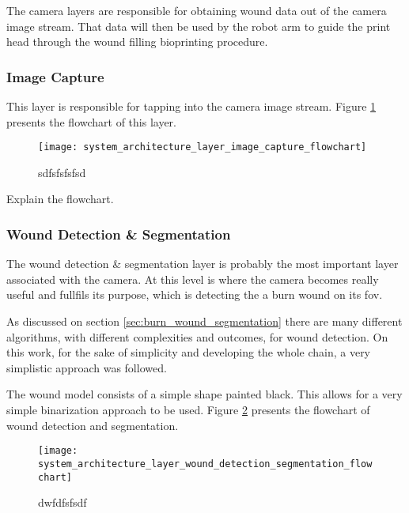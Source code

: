 The camera layers are responsible for obtaining wound data out of the camera image stream. That data will then be used by the robot arm to guide the print head through the wound filling bioprinting procedure.

\subsubsection*{Image Capture}
\label{subsubsec:system_architectural_camera_layers_image_capture}

This layer is responsible for tapping into the camera image stream. Figure \ref{fig:system_architecture_layer_image_capture_flowchart} presents the flowchart of this layer.

\begin{figure}[htbp]
	\centering
	\texttt{[image: system\_architecture\_layer\_image\_capture\_flowchart]}
	\caption{sdfsfsfsfsd}
	\label{fig:system_architecture_layer_image_capture_flowchart}
\end{figure}

{\color{red}Explain the flowchart.}


\subsubsection*{Wound Detection \& Segmentation}
\label{subsubsec:system_architectural_camera_layers_wound_detection_segmentation}

The wound detection \& segmentation layer is probably the most important layer associated with the camera. At this level is where the camera becomes really useful and fullfils its purpose, which is detecting the a burn wound on its \gls{fov}.

As discussed on section \ref{sec:burn_wound_segmentation} there are many different algorithms, with different complexities and outcomes, for wound detection. On this work, for the sake of simplicity and developing the whole chain, a very simplistic approach was followed.

The wound model consists of a simple shape painted black. This allows for a very simple binarization approach to be used. Figure \ref{fig:system_architecture_layer_wound_detection_segmentation_flowchart} presents the flowchart of wound detection and segmentation.

\begin{figure}[htbp]
	\centering
	\texttt{[image: system\_architecture\_layer\_wound\_detection\_segmentation\_flowchart]}
	\caption{dwfdfsfsdf}
	\label{fig:system_architecture_layer_wound_detection_segmentation_flowchart}
\end{figure}

